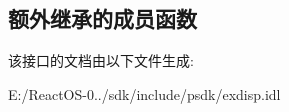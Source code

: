 \subsection*{额外继承的成员函数}


该接口的文档由以下文件生成\+:\begin{DoxyCompactItemize}
\item 
E\+:/\+React\+O\+S-\/0../sdk/include/psdk/exdisp.\+idl\end{DoxyCompactItemize}
